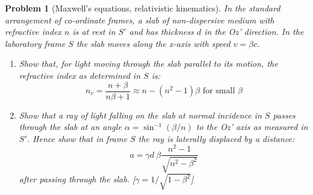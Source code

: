 \documentclass[a4paper]{article}
\theoremstyle{new}
\newtheorem{qns}{Problem}
\begin{document}
\newpage
\begin{qns}[Maxwell's equations, relativistic kinematics]
In the standard arrangement of co-ordinate frames, a slab of non-dispersive medium with refractive index $n$ is at rest in $S'$ and has thickness $d$ in the Oz' direction. In the laboratory frame $S$ the slab moves along the x-axis with speed $v = \beta c$.
\begin{enumerate}[label=(\roman*)]
\item Show that, for light moving through the slab parallel to its motion, the refractive index as determined in $S$ is:
$$n_v=\frac{n+\beta}{n\beta+1}\approx n-(n^2-1)\beta \text{ for small }\beta$$
\item Show that a ray of light falling on the slab at normal incidence in $S$ passes through the slab at an angle $\alpha=\sin^{-1}(\beta/n)$ to the Oz' axis as measured in $S'$. Hence show that in frame $S$ the ray is laterally displaced by a distance:
$$a=\gamma d~\beta\frac{n^2-1}{\sqrt{n^2-\beta^2}}$$
after passing through the slab. [$\gamma=1/\sqrt{1-\beta^2}$]
\end{enumerate}
\end{qns}
\end{document}
